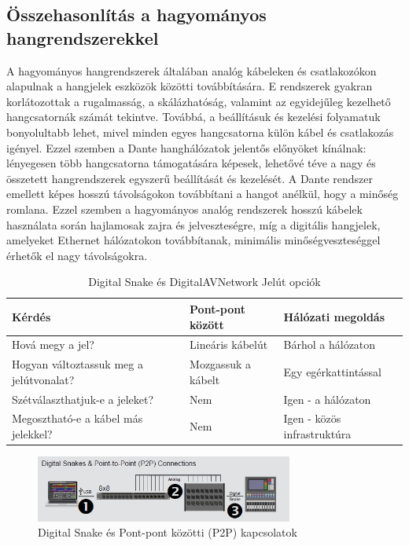 \subsection{Összehasonlítás a hagyományos hangrendszerekkel}
A hagyományos hangrendszerek általában analóg kábeleken és csatlakozókon alapulnak 
a hangjelek eszközök közötti továbbítására. E rendszerek gyakran korlátozottak 
a rugalmasság, a skálázhatóság, valamint az egyidejűleg kezelhető hangcsatornák 
számát tekintve. Továbbá, a beállításuk és kezelési folyamatuk bonyolultabb lehet, 
mivel minden egyes hangcsatorna külön kábel és csatlakozás igényel. Ezzel szemben 
a Dante hanghálózatok jelentős előnyöket kínálnak: lényegesen több hangcsatorna 
támogatására képesek, lehetővé téve a nagy és összetett hangrendszerek egyszerű 
beállítását és kezelését. A Dante rendszer emellett képes hosszú távolságokon 
továbbítani a hangot anélkül, hogy a minőség romlana. Ezzel szemben a hagyományos 
analóg rendszerek hosszú kábelek használata során hajlamosak zajra és jelveszteségre, 
míg a digitális hangjelek, amelyeket Ethernet hálózatokon továbbítanak, minimális 
minőségveszteséggel érhetők el nagy távolságokra.
\begin{table}[htbp]
    \centering
    \caption{Digital Snake és DigitalAVNetwork Jelút opciók}
    \begin{tabular}{@{}lll@{}}
        \toprule
        \textbf{Kérdés} & \textbf{Pont-pont között} & \textbf{Hálózati megoldás} \\ \midrule
        Hová megy a jel? & Lineáris kábelút & Bárhol a hálózaton \\
        Hogyan változtassuk meg a jelútvonalat? & Mozgassuk a kábelt & Egy egérkattintással \\
        Szétválaszthatjuk-e a jeleket? & Nem & Igen - a hálózaton \\
        Megosztható-e a kábel más jelekkel? & Nem & Igen - közös infrastruktúra \\
        \bottomrule
    \end{tabular}
    \label{tab:digital-snake-vs-digitalavnetwork-hu}
\end{table}
\begin{figure}[H]
	\centering
	\includegraphics[width=320px, keepaspectratio]{figures/dsnake-p2p.jpg}
	\caption{Digital Snake és Pont-pont közötti (P2P) kapcsolatok}
	\label {fig:dsnake-p2p}
\end{figure}
